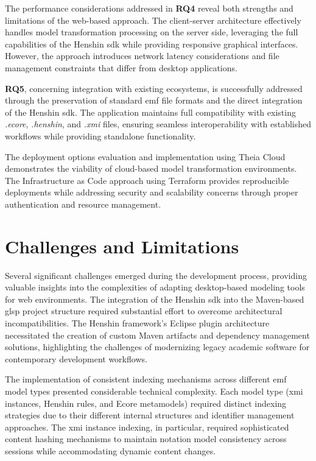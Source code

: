   The performance considerations addressed in \textbf{RQ4} reveal both strengths and limitations of the web-based approach. The client-server architecture effectively handles model transformation processing on the server side, leveraging the full capabilities of the Henshin \ac{sdk} while providing responsive graphical interfaces. However, the approach introduces network latency considerations and file management constraints that differ from desktop applications.

  \textbf{RQ5}, concerning integration with existing ecosystems, is successfully addressed through the preservation of standard \ac{emf} file formats and the direct integration of the Henshin \ac{sdk}. The application maintains full compatibility with existing \textit{.ecore}, \textit{.henshin}, and \textit{.xmi} files, ensuring seamless interoperability with established workflows while providing standalone functionality.

  The deployment options evaluation and implementation using Theia Cloud demonstrates the viability of cloud-based model transformation environments. The Infrastructure as Code approach using Terraform provides reproducible deployments while addressing security and scalability concerns through proper authentication and resource management.

  \section{Challenges and Limitations}
  \label{subsec:challenges-limitations}

  Several significant challenges emerged during the development process, providing valuable insights into the complexities of adapting desktop-based modeling tools for web environments. The integration of the Henshin \ac{sdk} into the Maven-based \ac{glsp} project structure required substantial effort to overcome architectural incompatibilities. The Henshin framework's Eclipse plugin architecture necessitated the creation of custom Maven artifacts and dependency management solutions, highlighting the challenges of modernizing legacy academic software for contemporary development workflows.

  The implementation of consistent indexing mechanisms across different \ac{emf} model types presented considerable technical complexity. Each model type (\ac{xmi} instances, Henshin rules, and Ecore metamodels) required distinct indexing strategies due to their different internal structures and identifier management approaches. The \ac{xmi} instance indexing, in particular, required sophisticated content hashing mechanisms to maintain notation model consistency across sessions while accommodating dynamic content changes.

